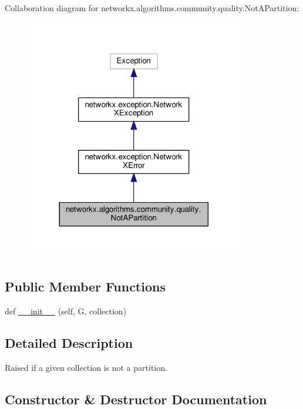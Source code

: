 Collaboration diagram for networkx.\+algorithms.\+community.\+quality.\+Not\+A\+Partition\+:
\nopagebreak
\begin{figure}[H]
\begin{center}
\leavevmode
\includegraphics[width=270pt]{classnetworkx_1_1algorithms_1_1community_1_1quality_1_1NotAPartition__coll__graph}
\end{center}
\end{figure}
\subsection*{Public Member Functions}
\begin{DoxyCompactItemize}
\item 
def \hyperlink{classnetworkx_1_1algorithms_1_1community_1_1quality_1_1NotAPartition_ac6a8c3c67f2b23fe2d56776228229c41}{\+\_\+\+\_\+init\+\_\+\+\_\+} (self, G, collection)
\end{DoxyCompactItemize}


\subsection{Detailed Description}
\begin{DoxyVerb}Raised if a given collection is not a partition.\end{DoxyVerb}
 

\subsection{Constructor \& Destructor Documentation}
\mbox{\label{classnetworkx_1_1algorithms_1_1community_1_1quality_1_1NotAPartition_ac6a8c3c67f2b23fe2d56776228229c41}} 
